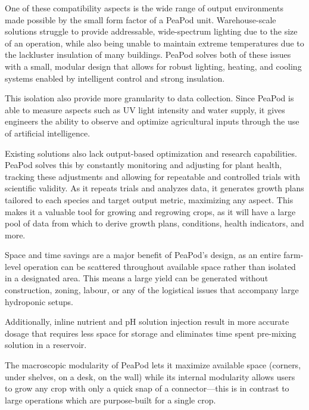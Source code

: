 \documentclass{report}
\begin{document}
One of these compatibility aspects is the wide range of output environments made possible by the small form factor of a PeaPod unit. Warehouse-scale solutions struggle to provide addressable, wide-spectrum lighting due to the size of an operation, while also being unable to maintain extreme temperatures due to the lackluster insulation of many buildings. PeaPod solves both of these issues with a small, modular design that allows for robust lighting, heating, and cooling systems enabled by intelligent control and strong insulation. 

This isolation also provide more granularity to data collection. Since PeaPod is able to measure aspects such as UV light intensity and water supply, it gives engineers the ability to observe and optimize agricultural inputs through the use of artificial intelligence.

Existing solutions also lack output-based optimization and research capabilities. PeaPod solves this by constantly monitoring and adjusting for plant health, tracking these adjustments and allowing for repeatable and controlled trials with scientific validity. As it repeats trials and analyzes data, it generates growth plans tailored to each species and target output metric, maximizing any aspect. This makes it a valuable tool for growing and regrowing crops, as it will have a large pool of data from which to derive growth plans, conditions, health indicators, and more.

Space and time savings are a major benefit of PeaPod's design, as an entire farm-level operation can be scattered throughout available space rather than isolated in a designated area. This means a large yield can be generated without construction, zoning, labour, or any of the logistical issues that accompany large hydroponic setups. 

Additionally, inline nutrient and pH solution injection result in more accurate dosage that requires less space for storage and eliminates time spent pre-mixing solution in a reservoir. 

The macroscopic modularity of PeaPod lets it maximize available space (corners, under shelves, on a desk, on the wall) while its internal modularity allows users to grow any crop with only a quick snap of a connector---this is in contrast to large operations which are purpose-built for a single crop.
\end{document}
